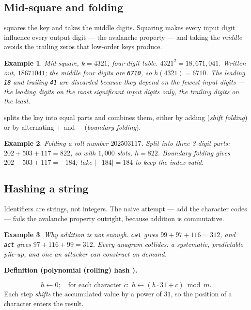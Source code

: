\documentclass[11pt]{article}
\newtheorem{example}{Example}[section]
\newenvironment{definitionbox}[1]{%
  \par\noindent\textbf{Definition (#1).}\ \itshape
}{\par\vspace{0.3em}}
\begin{document}
\subsection{Mid-square and folding}

 squares the key and takes the middle digits. Squaring makes every input digit influence every output digit --- the avalanche property --- and taking the \emph{middle} avoids the trailing zeros that low-order keys produce.

\begin{example}
\emph{Mid-square, $k = 4321$, four-digit table.} $4321^2 = 18{,}671{,}041$. Written out, $18671041$; the middle four digits are \texttt{6710}, so $h(4321) = 6710$. The leading \texttt{18} and trailing \texttt{41} are discarded because they depend on the fewest input digits --- the leading digits on the most significant input digits only, the trailing digits on the least.
\end{example}

 splits the key into equal parts and combines them, either by adding (\emph{shift folding}) or by alternating $+$ and $-$ (\emph{boundary folding}).

\begin{example}
\emph{Folding a roll number $202503117$.} Split into three 3-digit parts: $202 + 503 + 117 = 822$, so with $1{,}000$ slots, $h = 822$. Boundary folding gives $202 - 503 + 117 = -184$; take $|-184| = 184$ to keep the index valid.
\end{example}

\subsection{Hashing a string}

Identifiers are strings, not integers. The naive attempt --- add the character codes --- fails the avalanche property outright, because addition is commutative.

\begin{example}
\emph{Why addition is not enough.} \texttt{cat} gives $99 + 97 + 116 = 312$, and \texttt{act} gives $97 + 116 + 99 = 312$. Every anagram collides: a systematic, predictable pile-up, and one an attacker can construct on demand.
\end{example}

\begin{definitionbox}{polynomial (rolling) hash \cite{Sedgewick2011_algorithms,Karumanchi2017_data_structures_algorithms_made_easy}}
\[ h \leftarrow 0;\quad
   \text{for each character } c:\;
   h \leftarrow (h \cdot 31 + c) \bmod m . \]
Each step \emph{shifts} the accumulated value by a power of $31$, so the position of a character enters the result.
\end{definitionbox}
\end{document}
